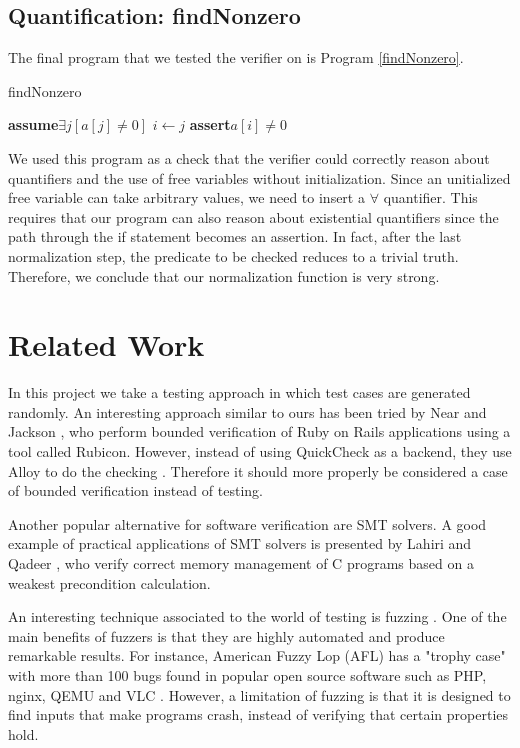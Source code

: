 \documentclass[a4paper]{article}
\newcommand{\Assert}{\State\textbf{assert}\xspace}
\newcommand{\Assume}{\State\textbf{assume}\xspace}
\begin{document}
\subsection{Quantification: findNonzero}

The final program that we tested the verifier on is Program \ref{findNonzero}.

\begin{algorithm}
\caption{findNonzero} \label{findNonzero}
\begin{algorithmic}
\Assume $\exists j [a[j] \neq 0]$
			\State $i \gets j$
		\EndIf
	\EndVar
\EndWhile
\Assert $a[i] \neq 0$
\end{algorithmic}
\end{algorithm}

We used this program as a check that the verifier could correctly reason about quantifiers and the use of free variables without initialization. Since an unitialized free variable can take arbitrary values, we need to insert a $\forall$ quantifier. This requires that our program can also reason about existential quantifiers since the path through the if statement becomes an assertion. In fact, after the last normalization step, the predicate to be checked reduces to a trivial truth. Therefore, we conclude that our normalization function is very strong.

\section{Related Work}

In this project we take a testing approach in which test cases are generated
randomly. An interesting approach similar to ours has been tried by Near and Jackson
\cite{rubicon}, who perform bounded verification of Ruby on Rails applications
using a tool called Rubicon. However, instead of using QuickCheck as a backend,
they use Alloy to do the checking \cite{alloy}. Therefore it should more
properly be considered a case of bounded verification instead of testing.

Another popular alternative for software verification are SMT solvers.
A good example of practical applications of
SMT solvers is presented by Lahiri and Qadeer \cite{Lahiri}, who verify correct
memory management of C programs based on a weakest precondition calculation.

An interesting technique associated to the world of testing is fuzzing \cite{takanen2008fuzzing}.
One of the main benefits of fuzzers is that they are highly automated and
produce remarkable results. For instance, American Fuzzy Lop (AFL) has a "trophy case"
with more than 100 bugs found in popular open source software such as PHP, nginx, QEMU
and VLC \cite{afl}. However, a limitation of fuzzing is that it is designed to find
inputs that make programs crash, instead of verifying that certain properties hold.
\end{document}
